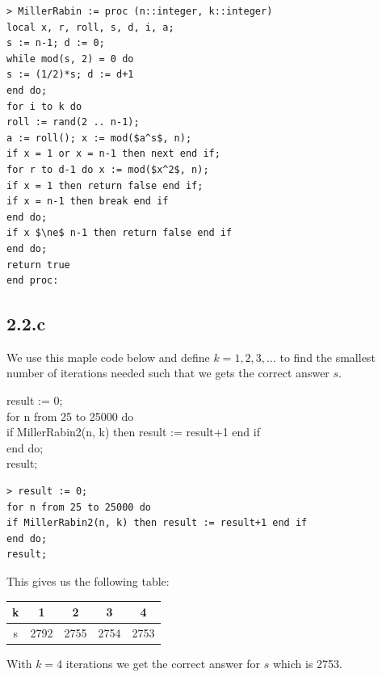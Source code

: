 \documentclass[11pt]{report}
\begin{document}
\begin{lstlisting}[style=Maple]
> MillerRabin := proc (n::integer, k::integer)
local x, r, roll, s, d, i, a;
s := n-1; d := 0;
while mod(s, 2) = 0 do
s := (1/2)*s; d := d+1
end do;
for i to k do
roll := rand(2 .. n-1);
a := roll(); x := mod($a^s$, n);
if x = 1 or x = n-1 then next end if;
for r to d-1 do x := mod($x^2$, n);
if x = 1 then return false end if;
if x = n-1 then break end if
end do;
if x $\ne$ n-1 then return false end if
end do;
return true
end proc:
\end{lstlisting}

\subsection*{2.2.c}
We use this maple code below and define $k = 1,2,3,\dots$ to find the smallest number of iterations needed such that we gets the correct answer $s$.
\begin{mapleinput}
result := 0; \\
for n from 25 to 25000 do \\
if MillerRabin2(n, k) then result := result+1 end if \\
end do; \\
result;
\end{mapleinput}

\begin{lstlisting}[style=Maple]
> result := 0;
for n from 25 to 25000 do
if MillerRabin2(n, k) then result := result+1 end if
end do;
result;
\end{lstlisting}

This gives us the following table:
\begin{center}
\begin{tabular}{| c | c | c | c | c |}
\hline
k & 1 & 2 & 3 & 4 \\ \hline
s & 2792 & 2755 & 2754 & 2753 \\ \hline
\end{tabular}
\end{center}
With $k = 4$ iterations we get the correct answer for $s$ which is 2753.
\end{document}
